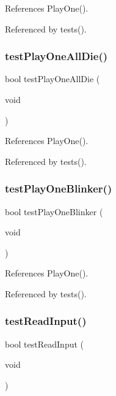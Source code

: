 References Play\+One().



Referenced by tests().

\mbox{\label{tests_8c_a6d4b00dae79274e5ba83ddbf0332dd95}} 
\subsubsection{test\+Play\+One\+All\+Die()}
{\footnotesize\ttfamily bool test\+Play\+One\+All\+Die (\begin{DoxyParamCaption}\item[{void}]{ }\end{DoxyParamCaption})}



References Play\+One().



Referenced by tests().

\mbox{\label{tests_8c_a8c76856f6c17c69dc291c9c921298b9e}} 
\subsubsection{test\+Play\+One\+Blinker()}
{\footnotesize\ttfamily bool test\+Play\+One\+Blinker (\begin{DoxyParamCaption}\item[{void}]{ }\end{DoxyParamCaption})}



References Play\+One().



Referenced by tests().

\mbox{\label{tests_8c_aa89f64db87aebe77bd891e2894595e4e}} 
\subsubsection{test\+Read\+Input()}
{\footnotesize\ttfamily bool test\+Read\+Input (\begin{DoxyParamCaption}\item[{void}]{ }\end{DoxyParamCaption})}



